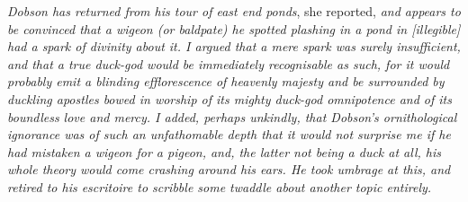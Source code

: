 \emph{Dobson has returned from his tour of east end ponds}, she reported, \emph{and appears to be convinced that a wigeon (or baldpate) he spotted plashing in a pond in [illegible] had a spark of divinity about it. I argued that a mere spark was surely insufficient, and that a true duck-god would be immediately recognisable as such, for it would probably emit a blinding efflorescence of heavenly majesty and be surrounded by duckling apostles bowed in worship of its mighty duck-god omnipotence and of its boundless love and mercy. I added, perhaps unkindly, that Dobson's ornithological ignorance was of such an unfathomable depth that it would not surprise me if he had mistaken a wigeon for a pigeon, and, the latter not being a duck at all, his whole theory would come crashing around his ears. He took umbrage at this, and retired to his escritoire to scribble some twaddle about another topic entirely.}